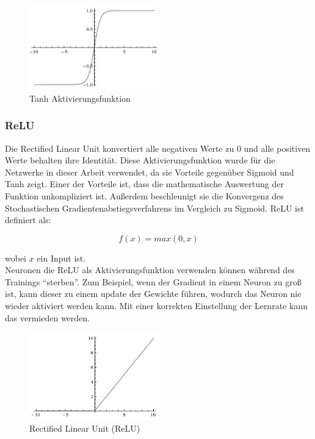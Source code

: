 \begin{figure}[H]
  \centering
  \includegraphics[width=0.5\textwidth]{resources/nn/tanh.png}
  \caption{
    Tanh Aktivierungsfunktion
    \cite{neuron-model}
  }
  \label{image:tanh}
\end{figure}

\subsubsection{ReLU}
Die Rectified Linear Unit konvertiert alle negativen Werte zu 0 und alle positiven Werte behalten ihre Identität. Diese Aktivierungsfunktion
wurde für die Netzwerke in dieser Arbeit verwendet, da sie Vorteile gegenüber Sigmoid und Tanh zeigt. Einer der Vorteile ist, dass die mathematische
Auswertung der Funktion unkompliziert ist. Außerdem beschleunigt sie die Konvergenz des Stochastischen Gradientenabstiegsverfahrens im Vergleich zu Sigmoid.
ReLU ist definiert als:

\begin{equation}
  f(x) = max(0, x)
\end{equation}

wobei $x$ ein Input ist.
\\
Neuronen die ReLU als Aktivierungsfunktion verwenden können während des Trainings ``sterben''. Zum Beispiel, wenn der Gradient in einem Neuron
zu groß ist, kann dieser zu einem update der Gewichte führen, wodurch das Neuron nie wieder aktiviert werden kann. Mit einer korrekten Einstellung der
Lernrate kann das vermieden werden. \cite{cs231-neural-networks}

\begin{figure}[H]
  \centering
  \includegraphics[width=0.5\textwidth]{resources/nn/relu.jpeg}
  \caption{
    Rectified Linear Unit (ReLU)
    \cite{neuron-model}
  }
  \label{image:relu}
\end{figure}

